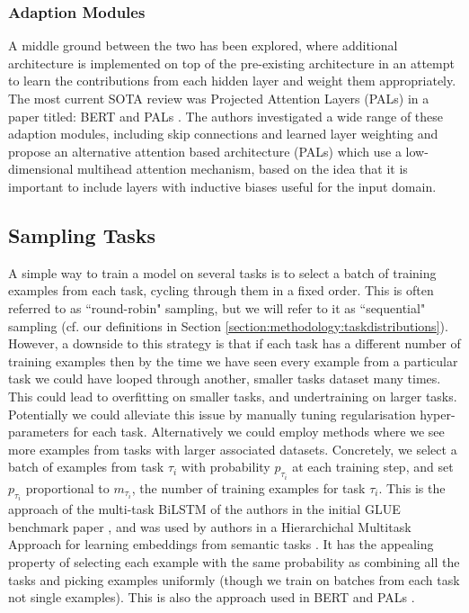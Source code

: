 {{\subsubsection{Adaption Modules}
A middle ground between the two has been explored, where additional architecture is implemented on top of the pre-existing architecture in an attempt to learn the contributions from each hidden layer and weight them appropriately. The most current SOTA review was Projected Attention Layers (PALs) in a paper titled: BERT and PALs \cite{Stickland2019}. The authors investigated a wide range of these adaption modules, including skip connections and learned layer weighting and propose an alternative attention based architecture (PALs) which use a low-dimensional multihead attention mechanism, based on the idea that it is important to include layers with inductive biases useful for the input domain. 

\subsection{Sampling Tasks} \label{section:background:samplingtasks}
A simple way to train a model on several tasks is to select a batch of training examples from each task, cycling through them in a fixed order. This is often referred to as ``round-robin" sampling, but we will refer to it as ``sequential" sampling (cf. our definitions in Section \ref{section:methodology:taskdistributions}). However, a downside to this strategy is that if each task has a different number of training examples then by the time we have seen every example from a particular task we could have looped through another, smaller tasks dataset many times. This could lead to overfitting on smaller tasks, and undertraining on larger tasks. Potentially we could alleviate this issue by manually tuning regularisation hyper-parameters for each task.
Alternatively we could employ methods where we see more examples from tasks with larger associated datasets. Concretely, we select a batch of examples from task $\tau_i$ with probability $p_{\tau_i}$ at each training step, and set $p_{\tau_i}$ proportional to $m_{\tau_i}$, the number of training examples for task $\tau_i$. This is the approach of the multi-task BiLSTM of the authors in the initial GLUE benchmark paper \cite{Wang2018}, and was used by authors in a Hierarchichal Multitask Approach for learning embeddings from semantic tasks \cite{Sanh2018} . It has the appealing property of selecting each example with the same probability as combining all the tasks and picking examples uniformly (though we train on batches from each task not single examples). This is also the approach used in BERT and PALs \cite{Stickland2019}.

}}

